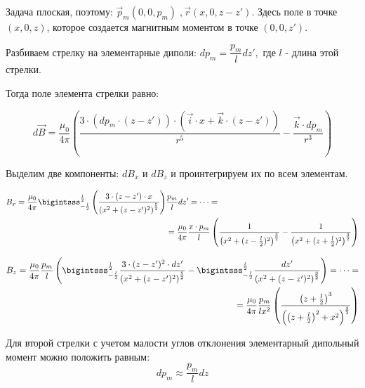 \documentclass{letask}
\begin{document}
Задача плоская, поэтому: $\vec p_m (0, 0, p_m) \; , \vec r (x, 0, z-z')$. Здесь поле в точке $(x, 0, z)$, которое создается магнитным моментом в точке $(0,0,z')$.



Разбиваем стрелку на элементарные диполи: $dp_m = \dfrac{p_m}{l} dz',$ где $l$ - длина этой стрелки.

Тогда поле элемента стрелки равно:

\begin{equation}
d \vec{B} = \dfrac{\mu_0}{4 \pi}
	\left(
		\dfrac{3 \cdot 
			\left(dp_m \cdot (z-z') \right) 
			\cdot 
			\left( \vec{i} \cdot x + \vec{k} \cdot (z-z') \right)
		}{r^5}
	- \dfrac{\vec{k} \cdot dp_m}{r^3} 
	\right)
\end{equation}

Выделим две компоненты: $dB_x$ и $dB_z$ и проинтегрируем их по всем элементам. 

\begin{equation}
\begin{split}
B_x = \dfrac{\mu_0}{4 \pi} \bigintsss_{-\frac{l}{2}}^{\frac{l}{2}}
	\left(
		\dfrac{3 \cdot (z-z') \cdot x}
		{\left(x^2 + (z-z')^2 \right)^{\frac{5}{2}}}
	\right)&
	\dfrac{p_m}{l} dz' =
	\cdots = \\
	& = \dfrac{\mu_0}{4 \pi}
	\dfrac{x \cdot p_m}{l}
	\left(
		\dfrac{1}{\left(x^2 + (z-\frac{l}{2})^2 \right)^{\frac{3}{2}}} - 
		\dfrac{1}{\left(x^2 + (z+\frac{l}{2})^2 \right)^{\frac{3}{2}}} 
	\right)
\end{split}
\end{equation}

\begin{equation}
\begin{split}
B_z = \dfrac{\mu_0}{4 \pi} \dfrac{p_m}{l}
\left(
	\bigintsss_{-\frac{l}{2}}^{\frac{l}{2}}
	\dfrac{3 \cdot (z-z')^2 \cdot dz'}
	{\left(x^2 + (z-z')^2 \right)^{\frac{5}{2}}} - 
	 \bigintsss_{-\frac{l}{2}}^{\frac{l}{2}}
	\dfrac{dz'} 
	{\left(x^2 + (z-z')^2 \right)^{\frac{3}{2}}}
\right) =
	\cdots = \\ 
	  = \dfrac{\mu_0}{4 \pi} \dfrac{p_m}{lx^2}
\left(
	\dfrac{\left(z+\frac{l}{2}\right)^3}
	{\left(\left(z+\frac{l}{2}\right)^2 + x^2 \right)^{\frac{3}{2}}}
\right)
\end{split}
\end{equation}

Для второй стрелки с учетом малости углов отклонения элементарный дипольный момент можно положить равным:
$$dp_m \approx \dfrac{p_m}{l} dz$$
\end{document}
